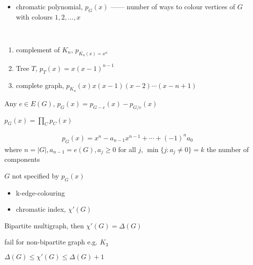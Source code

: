 \begin{itemize}
    \item chromatic polynomial, $p_G(x)$ ------ number of ways to colour vertices of $G$ with colours $1, 2, \dots, x$
\end{itemize}

\begin{example}
    \,
    \begin{enumerate}
        \item complement of $K_n$, $p_{\bar{K_n}(x) = x^n}$
        \item Tree $T$, $p_T(x) = x(x-1)^{n-1}$
        \item complete graph, $p_{K_n}(x) x(x - 1)(x - 2)\cdots(x - n + 1)$
    \end{enumerate}
\end{example}

\begin{thm}
    Any $e \in E(G)$, $p_G(x) = p_{G-e}(x) - p_{G/e}(x)$
\end{thm}

\begin{fact}
    $p_G(x) = \prod_C p_C(x)$
\end{fact}

\begin{cor}
    \begin{align*}
        p_G(x) = x^n - a_{n-1} x^{n-1} + \cdots + (-1)^n a_0
    \end{align*}
    where $n = |G|, a_{n-1} = e(G), a_j \geq 0$ for all $j$, $\min\{j: a_j \neq 0\} = k$ the number of components
\end{cor}

\begin{fact}
    $G$ not specified by $p_G(x)$
\end{fact}

\begin{itemize}
    \item k-edge-colouring
    \item chromatic index, $\chi'(G)$
\end{itemize}

\begin{thm}
    Bipartite multigraph, then $\chi'(G) = \Delta(G)$
\end{thm}

\begin{fact}
    fail for non-bipartite graph e.g. $K_3$
\end{fact}

\begin{thm}[Vizing]
    $\Delta(G) \leq \chi'(G) \leq \Delta(G) + 1$
\end{thm}

